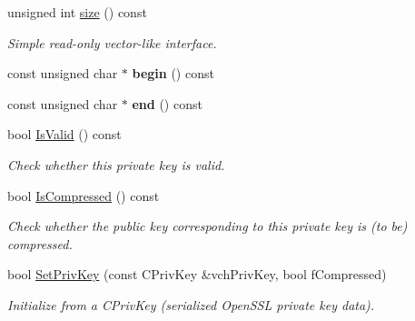 \begin{DoxyCompactItemize}
\mbox{\label{class_c_key_a468a9a8cd148ab4a43e7d76bbdc78abe}} 
unsigned int \mbox{\hyperlink{class_c_key_a468a9a8cd148ab4a43e7d76bbdc78abe}{size}} () const
\begin{DoxyCompactList}\small\item\em Simple read-\/only vector-\/like interface. \end{DoxyCompactList}\item 
\mbox{\label{class_c_key_ab8dee0ad9d933304a22284ee40040847}} 
const unsigned char $\ast$ {\bfseries begin} () const
\item 
\mbox{\label{class_c_key_a41c700c4a732672e4b7cc60d811dbf41}} 
const unsigned char $\ast$ {\bfseries end} () const
\item 
\mbox{\label{class_c_key_a56e06c48d504a1a65e244e5fc35cdecc}} 
bool \mbox{\hyperlink{class_c_key_a56e06c48d504a1a65e244e5fc35cdecc}{Is\+Valid}} () const
\begin{DoxyCompactList}\small\item\em Check whether this private key is valid. \end{DoxyCompactList}\item 
\mbox{\label{class_c_key_a96b017433a65335775cf3807d73f85ce}} 
bool \mbox{\hyperlink{class_c_key_a96b017433a65335775cf3807d73f85ce}{Is\+Compressed}} () const
\begin{DoxyCompactList}\small\item\em Check whether the public key corresponding to this private key is (to be) compressed. \end{DoxyCompactList}\item 
\mbox{\label{class_c_key_aa62c082c9037565fce02b457cc335e7b}} 
bool \mbox{\hyperlink{class_c_key_aa62c082c9037565fce02b457cc335e7b}{Set\+Priv\+Key}} (const C\+Priv\+Key \&vch\+Priv\+Key, bool f\+Compressed)
\begin{DoxyCompactList}\small\item\em Initialize from a C\+Priv\+Key (serialized Open\+S\+SL private key data). \end{DoxyCompactList}\item 
\mbox{\label{class_c_key_a9d12ed9d297e4286250fd7ea6b59e1a5}} 

\end{DoxyCompactItemize}
